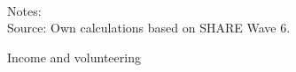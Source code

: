 \documentclass[10pt, letterpaper]{article}
\begin{document}
\begin{spacing}{1.4}
\begin{spacing}{.9}
\begin{figure}[H]
\centering
\caption{Income and volunteering} 
\label{fig:casp_ols}
\begin{minipage}{1\linewidth}
\quad
{}~\\ 
{\footnotesize Notes: }~\\
{\footnotesize Source: Own calculations based on SHARE Wave 6.}
\end{minipage}
\end{figure} 


%	 

\begin{spacing}{.9}
	 
      \label{tauLS} 
\end{spacing}




\end{spacing}
\end{spacing}
\end{document}
